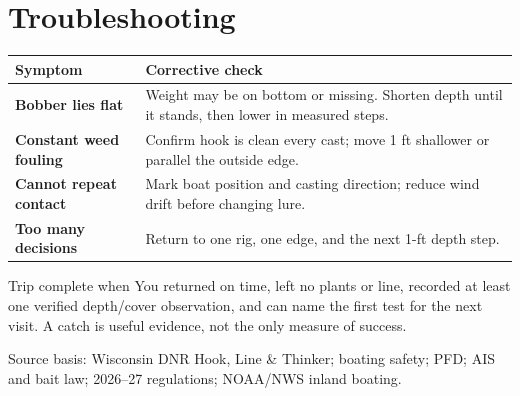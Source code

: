 \section{Troubleshooting}
\begin{tabularx}{\linewidth}{@{}>{\bfseries}p{.23\linewidth}X@{}}
\toprule Symptom&Corrective check\\\midrule
Bobber lies flat&Weight may be on bottom or missing. Shorten depth until it
stands, then lower in measured steps.\\
Constant weed fouling&Confirm hook is clean every cast; move 1 ft shallower or
parallel the outside edge.\\
Cannot repeat contact&Mark boat position and casting direction; reduce wind
drift before changing lure.\\
Too many decisions&Return to one rig, one edge, and the next 1-ft depth step.\\
\bottomrule
\end{tabularx}
\begin{telospanel}{Trip complete when}
You returned on time, left no plants or line, recorded at least one verified
depth/cover observation, and can name the first test for the next visit. A
catch is useful evidence, not the only measure of success.
\end{telospanel}

\small Source basis: Wisconsin DNR Hook, Line \& Thinker; boating safety; PFD;
AIS and bait law; 2026--27 regulations; NOAA/NWS inland boating.

